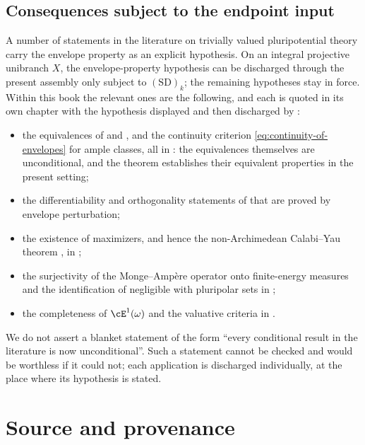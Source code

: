 \subsection{Consequences subject to the endpoint input}
\label{sec:ch45-unconditional}

A number of statements in the literature on trivially valued pluripotential
theory carry the envelope property as an explicit hypothesis.  On an integral projective unibranch $X$, the envelope-property
hypothesis can be discharged through the present assembly only subject
to $\mathrm{(SD)}_k$; the remaining hypotheses stay in force.  Within this
book the relevant ones are the following, and each is quoted in its own
chapter with the hypothesis displayed and then discharged by
:

\begin{itemize}
\item the equivalences of  and
      , and the continuity criterion
      \eqref{eq:continuity-of-envelopes} for ample classes, all in
      : the equivalences themselves are
      unconditional, and the theorem establishes their equivalent
      properties in the present setting;
\item the differentiability and orthogonality statements of
       that are proved by envelope perturbation;
\item the existence of maximizers, and hence the non-Archimedean
      Calabi--Yau theorem , in
      ;
\item the surjectivity of the Monge--Amp\`ere operator onto finite-energy
      measures and the identification of negligible with pluripolar sets in
      ;
\item the completeness of $\cE^1(\omega)$ and the valuative criteria in
      .
\end{itemize}

We do not assert a blanket statement of the form ``every conditional result
in the literature is now unconditional''.  Such a statement cannot be
checked and would be worthless if it could not; each application is
discharged individually, at the place where its hypothesis is stated.

\section{Source and provenance}
\label{sec:ch45-source-note}

